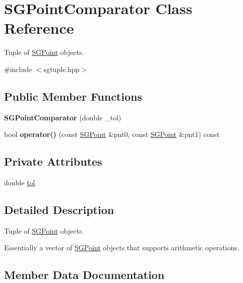 \hypertarget{classSGPointComparator}{}\section{S\+G\+Point\+Comparator Class Reference}
\label{classSGPointComparator}


Tuple of \hyperlink{classSGPoint}{S\+G\+Point} objects.  




{\ttfamily \#include $<$sgtuple.\+hpp$>$}

\subsection*{Public Member Functions}
\begin{DoxyCompactItemize}
\item 
\mbox{\label{classSGPointComparator_a9180e05c1c5b1b6e2bf758b611104866}} 
{\bfseries S\+G\+Point\+Comparator} (double \+\_\+tol)
\item 
\mbox{\label{classSGPointComparator_a50cb803ee30cc5d58b4593995cdb287b}} 
bool {\bfseries operator()} (const \hyperlink{classSGPoint}{S\+G\+Point} \&pnt0, const \hyperlink{classSGPoint}{S\+G\+Point} \&pnt1) const
\end{DoxyCompactItemize}
\subsection*{Private Attributes}
\begin{DoxyCompactItemize}
\item 
double \hyperlink{classSGPointComparator_aff30b497a9dce0eddc470f3d5bf6e09d}{tol}
\end{DoxyCompactItemize}


\subsection{Detailed Description}
Tuple of \hyperlink{classSGPoint}{S\+G\+Point} objects. 

Essentially a vector of \hyperlink{classSGPoint}{S\+G\+Point} objects that supports arithmetic operations. 

\subsection{Member Data Documentation}
\mbox{\label{classSGPointComparator_aff30b497a9dce0eddc470f3d5bf6e09d}} 
